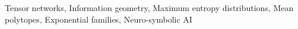 Tensor networks,
Information geometry,
Maximum entropy distributions,
Mean polytopes,
Exponential families,
Neuro-symbolic AI